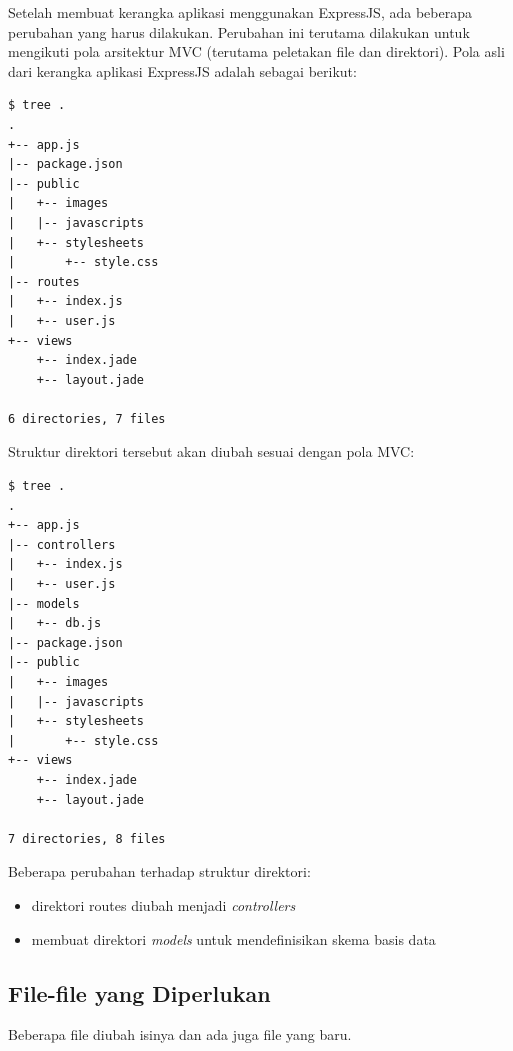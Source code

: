Setelah membuat kerangka aplikasi menggunakan ExpressJS, ada beberapa perubahan yang harus dilakukan. Perubahan ini terutama dilakukan untuk mengikuti pola arsitektur MVC (terutama peletakan file dan direktori). Pola asli dari kerangka aplikasi ExpressJS adalah sebagai berikut:

\lstset{language=Bash,caption=Struktur direktori asli aplikasi ExpressJS}
\begin{lstlisting}
$ tree .
.
+-- app.js
|-- package.json
|-- public
|   +-- images
|   |-- javascripts
|   +-- stylesheets
|       +-- style.css
|-- routes
|   +-- index.js
|   +-- user.js
+-- views
    +-- index.jade
    +-- layout.jade

6 directories, 7 files
\end{lstlisting}

Struktur direktori tersebut akan diubah sesuai dengan pola MVC:

\lstset{language=Bash,caption=Struktur direktori ExpressJS sesuai pola MVC}
\begin{lstlisting}
$ tree .
.
+-- app.js
|-- controllers
|   +-- index.js
|   +-- user.js
|-- models
|   +-- db.js
|-- package.json
|-- public
|   +-- images
|   |-- javascripts
|   +-- stylesheets
|       +-- style.css
+-- views
    +-- index.jade
    +-- layout.jade

7 directories, 8 files
\end{lstlisting}

Beberapa perubahan terhadap struktur direktori:
\begin{itemize}
	\item direktori routes diubah menjadi \textit{controllers}
	\item membuat direktori \textit{models} untuk mendefinisikan skema basis data
\end{itemize}

\subsection{File-file yang Diperlukan}

Beberapa file diubah isinya dan ada juga file yang baru. 

